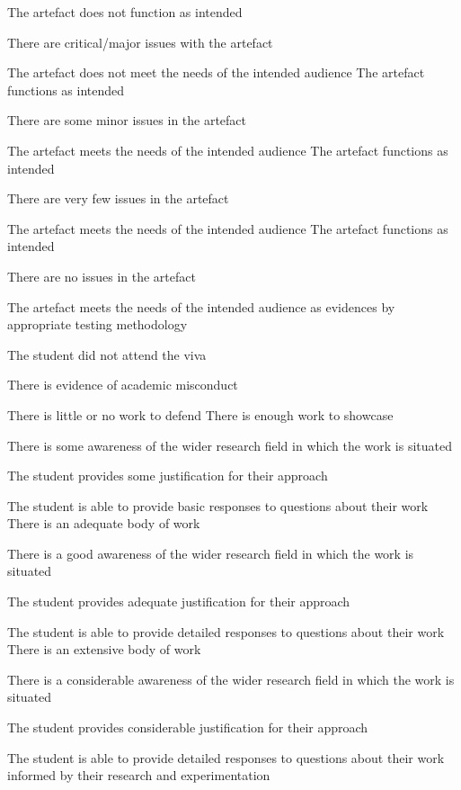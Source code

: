\begin{markingrubric}
        \grade\fail 	The artefact does not function as intended
            \par 		There are critical/major issues with the artefact
            \par        The artefact does not meet the needs of the intended audience
        \grade       	The artefact functions as intended
            \par 		There are some minor issues in the artefact
            \par        The artefact meets the needs of the intended audience
        \grade       	The artefact functions as intended
            \par 		There are very few issues in the artefact
            \par        The artefact meets the needs of the intended audience
        \grade       	The artefact functions as intended
            \par 		There are no issues in the artefact
            \par        The artefact meets the needs of the intended audience as evidences by appropriate testing methodology

        \grade\fail 	The student did not attend the viva 
            \par 		There is evidence of academic misconduct 
            \par        There is little or no work to defend
        \grade       	There is enough work to showcase
            \par 		There is some awareness of the wider research field in which the work is situated
            \par        The student provides some justification for their approach
            \par        The student is able to provide basic responses to questions about their work
        \grade       	There is an adequate body of work 
            \par 		There is a good awareness of the wider research field in which the work is situated
            \par        The student provides adequate justification for their approach
            \par        The student is able to provide detailed responses to questions about their work
        \grade       	There is an extensive body of work 
            \par 		There is a considerable awareness of the wider research field in which the work is situated 
            \par        The student provides considerable justification for their approach
            \par        The student is able to provide detailed responses to questions about their work informed by their research and experimentation

    
%
\end{markingrubric}
